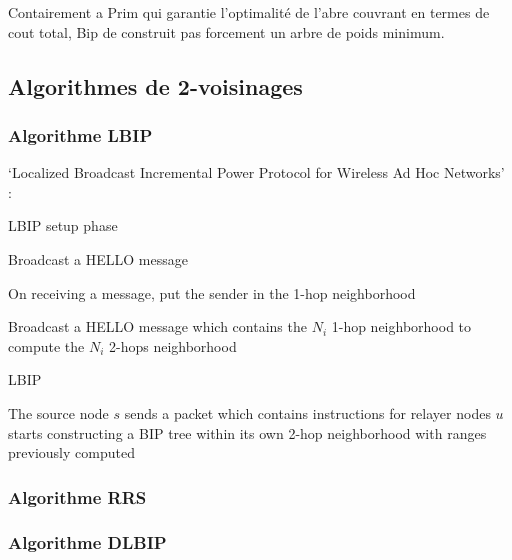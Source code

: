 Contairement a Prim qui garantie l'optimalité de l'abre couvrant en termes de cout total,
Bip de construit pas forcement un arbre de poids minimum.


\subsection{Algorithmes de 2-voisinages}
\subsubsection{Algorithme LBIP}
`Localized Broadcast Incremental Power Protocol for Wireless Ad Hoc Networks' :\cite{Ingelrest2004}

\begin{algorithm}[h]
\caption{LBIP setup phase}
\label{algo_LBIP_sp}
\begin{algorithmic}

	\STATE Broadcast a HELLO message
\ENDFOR

\STATE On receiving a message, put the sender in the 1-hop neighborhood

	\STATE Broadcast a HELLO message which contains the $N_i$ 1-hop neighborhood to compute the $N_i$ 2-hops neighborhood
\ENDFOR


\end{algorithmic}
\end{algorithm}



\begin{algorithm}[h]
\caption{LBIP}
\label{algo_LBIP}
\begin{algorithmic}

\STATE The source node $s$ sends a packet which contains instructions for relayer nodes
		\STATE $u$ starts constructing a BIP tree within its own 2-hop neighborhood with ranges previously computed
	\ENDIF
\ENDIF

\end{algorithmic}
\end{algorithm}

\subsubsection{Algorithme RRS}
\cite{Cartigny2003RNG}
\subsubsection{Algorithme DLBIP}
\cite{Baert07}
